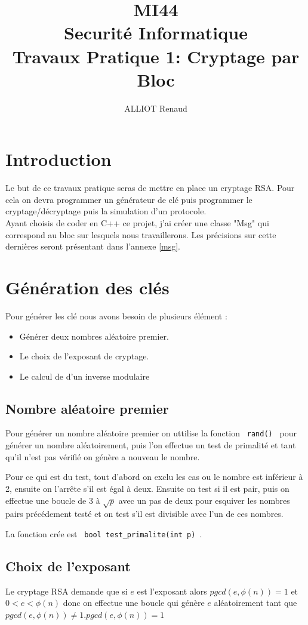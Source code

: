 \documentclass[10pt,a4paper]{article}
\author{ALLIOT Renaud}
\title{MI44\\Securité Informatique\\Travaux Pratique 1: Cryptage par Bloc}
\begin{document}
\maketitle
\newpage
\section{Introduction}
Le but de ce travaux pratique seras de mettre en place un cryptage RSA. Pour cela on devra programmer un générateur de clé puis programmer le cryptage/décryptage puis la simulation d'un protocole.\\
Ayant choisis de coder en C++ ce projet, j'ai créer une classe "Msg" qui correspond au bloc sur lesquels nous travaillerons. Les précisions sur cette dernières seront présentant dans l'annexe \ref{msg}.
\section{Génération des clés}
Pour générer les clé nous avons besoin de plusieurs élément :
\begin{itemize}
\item Générer deux nombres aléatoire premier.
\item Le choix de l'exposant de cryptage.
\item Le calcul de d'un inverse modulaire
\end{itemize}

\subsection*{Nombre aléatoire premier}
Pour générer un nombre aléatoire premier on uttilise la fonction \verb| rand() | pour générer un nombre aléatoirement, puis l'on effectue un test de primalité et tant qu'il n'est pas vérifié on génère a nouveau le nombre.

Pour ce qui est du test, tout d'abord on exclu les cas ou le nombre est inférieur à 2, ensuite on l'arrête s'il est égal à deux. Ensuite on test si il est pair, puis on effectue une boucle de 3 à $\sqrt{p}$ avec un pas de deux pour esquiver les nombres pairs précédement testé et on test s'il est divisible avec l'un de ces nombres.

La fonction crée est \verb| bool test_primalite(int p) |.
\subsection*{Choix de l'exposant}
Le cryptage RSA demande que si $e$ est l'exposant alors $pgcd(e, \phi(n)) = 1$ et $0<e<\phi(n)$ donc on effectue une boucle qui génère $e$ aléatoirement tant que $pgcd(e, \phi(n)) \neq 1$.$pgcd(e, \phi(n)) = 1$
\end{document}
